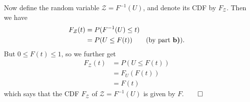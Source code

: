 \documentclass[11pt, letterpaper]{article}
\newcommand{\mc}[1]{\mathcal{#1}}
\begin{document}
    Now define the random variable $\mc{Z}=F^{-1}(U)$, and denote its CDF by $F_\mc{Z}$. Then we have
    \begin{align*}
        F_\mc{Z}(t)&=P(F^{-1}(U)\leq t)\\
        &=P(U\leq F(t))\tag{by part {\bf b)}}.
    \end{align*}
    But $0\leq F(t)\leq 1$, so we further get
    \begin{align*}
        F_\mc{Z}(t)&=P(U\leq F(t))\\
        &=F_U(F(t))\\
        &=F(t)\tag{by 5.1}
    \end{align*}
    which says that the CDF $F_\mc{Z}$ of $\mc{Z}=F^{-1}(U)$ is given by $F$.\hfill{$\qed$}\\[10pt]
\end{document}
